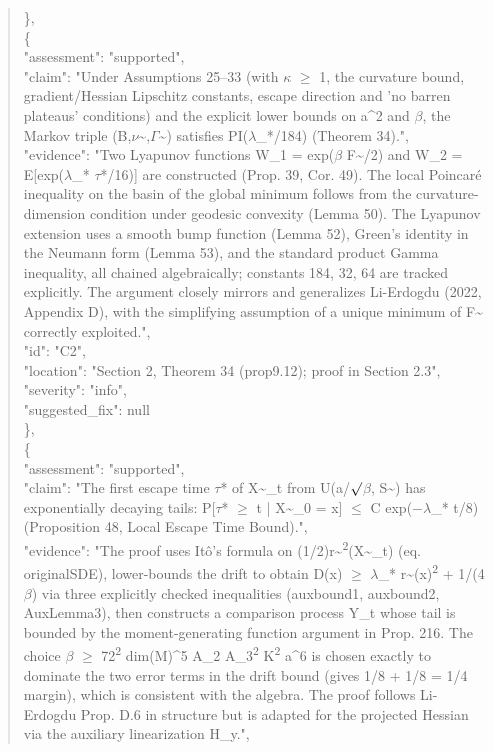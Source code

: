 \documentclass[11pt]{article}
\begin{document}
\begin{quote}
    \},\\
    \{\\
      "assessment": "supported",\\
      "claim": "Under Assumptions 25--33 (with \ensuremath{\kappa} \ensuremath{\ge} 1, the curvature bound, gradient/Hessian Lipschitz constants, escape direction and 'no barren plateaus' conditions) and the explicit lower bounds on a\^{}2 and \ensuremath{\beta}, the Markov triple (B,\ensuremath{\nu}\~{},\ensuremath{\Gamma}\~{}) satisfies PI(\ensuremath{\lambda}\_*/184) (Theorem 34).",\\
      "evidence": "Two Lyapunov functions W\_1 = exp(\ensuremath{\beta} F\~{}/2) and W\_2 = E[exp(\ensuremath{\lambda}\_* \ensuremath{\tau}*/16)] are constructed (Prop. 39, Cor. 49). The local Poincaré inequality on the basin of the global minimum follows from the curvature-dimension condition under geodesic convexity (Lemma 50). The Lyapunov extension uses a smooth bump function (Lemma 52), Green's identity in the Neumann form (Lemma 53), and the standard product Gamma inequality, all chained algebraically; constants 184, 32, 64 are tracked explicitly. The argument closely mirrors and generalizes Li-Erdogdu (2022, Appendix D), with the simplifying assumption of a unique minimum of F\~{} correctly exploited.",\\
      "id": "C2",\\
      "location": "Section 2, Theorem 34 (prop9.12); proof in Section 2.3",\\
      "severity": "info",\\
      "suggested\_fix": null\\
    \},\\
    \{\\
      "assessment": "supported",\\
      "claim": "The first escape time \ensuremath{\tau}* of X\~{}\_t from U(a/\ensuremath{\surd}\ensuremath{\beta}, S\~{}) has exponentially decaying tails: P[\ensuremath{\tau}* \ensuremath{\ge} t | X\~{}\_0 = x] \ensuremath{\le} C exp(\ensuremath{-}\ensuremath{\lambda}\_* t/8) (Proposition 48, Local Escape Time Bound).",\\
      "evidence": "The proof uses Itô's formula on (1/2)r\~{}\textsuperscript{2}(X\~{}\_t) (eq. originalSDE), lower-bounds the drift to obtain D(x) \ensuremath{\ge} \ensuremath{\lambda}\_* r\~{}(x)\textsuperscript{2} + 1/(4\ensuremath{\beta}) via three explicitly checked inequalities (auxbound1, auxbound2, AuxLemma3), then constructs a comparison process Y\_t whose tail is bounded by the moment-generating function argument in Prop. 216. The choice \ensuremath{\beta} \ensuremath{\ge} 72\textsuperscript{2} dim(M)\^{}5 A\_2 A\_3\textsuperscript{2} K\textsuperscript{2} a\^{}6 is chosen exactly to dominate the two error terms in the drift bound (gives 1/8 + 1/8 = 1/4 margin), which is consistent with the algebra. The proof follows Li-Erdogdu Prop. D.6 in structure but is adapted for the projected Hessian via the auxiliary linearization H\_y.",\\

\end{quote}
\end{document}

